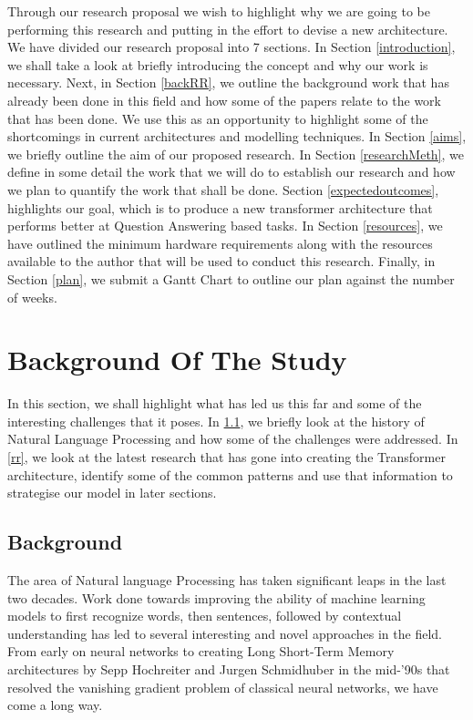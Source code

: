 \documentclass[12pt]{report}
\begin{document}
    Through our research proposal we wish to highlight why we are going to be performing this research and putting in the effort to devise a new architecture. We have divided our research proposal into 7 sections. In Section \ref{introduction}, we shall take a look at briefly introducing the concept and why our work is necessary. Next, in Section \ref{backRR}, we outline the background work that has already been done in this field and how some of the papers relate to the work that has been done. We use this as an opportunity to highlight some of the shortcomings in current architectures and modelling techniques. In Section \ref{aims}, we briefly outline the aim of our proposed research. In Section \ref{researchMeth}, we define in some detail the work that we will do to establish our research and how we plan to quantify the work that shall be done. Section \ref{expectedoutcomes}, highlights our goal, which is to produce a new transformer architecture that performs better at Question Answering based tasks.
    In Section \ref{resources}, we have outlined the minimum hardware requirements along with the resources available to the author that will be used to conduct this research. Finally, in Section \ref{plan}, we submit a Gantt Chart to outline our plan against the number of weeks.

        \section{Background Of The Study}\label{11}
        	In this section, we shall highlight what has led us this far and some of the interesting challenges that it poses. In \ref{back}, we briefly look at the history of Natural Language Processing and how some of the challenges were addressed. In \ref{rr}, we look at the latest research that has gone into creating the Transformer architecture, identify some of the common patterns and use that information to strategise our model in later sections.

        \subsection{Background}\label{back}

        The area of Natural language Processing has taken significant leaps in the last two decades. Work done towards improving the ability of machine learning models to first recognize words, then sentences, followed by contextual understanding has led to several interesting and novel approaches in the field. From early on neural networks to creating Long Short-Term Memory architectures \citep{originallstm} by Sepp Hochreiter and Jurgen Schmidhuber in the mid-'90s that resolved the vanishing gradient problem of classical neural networks, we have come a long way.
\end{document}
